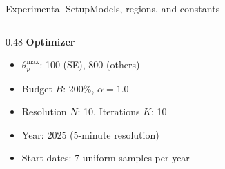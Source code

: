 \begin{frame}[t]{Experimental Setup}{Models, regions, and constants}
\begin{columns}[T]
\begin{column}{0.48\textwidth}
      \vspace{0.2cm}
      \textbf{Optimizer}
      \begin{itemize}
        \item $\theta_p^{\max}$: 100 (SE), 800 (others)
        \item Budget $B$: 200\%, $\alpha = 1.0$
        \item Resolution $N$: 10, Iterations $K$: 10
        \item Year: 2025 (5-minute resolution)
        \item Start dates: 7 uniform samples per year
      \end{itemize}
    \end{column}
  \end{columns}

\end{frame}
